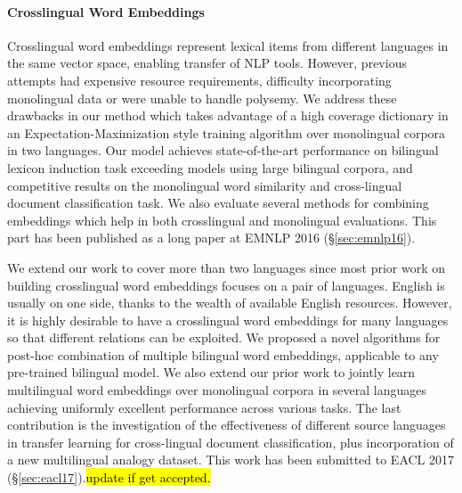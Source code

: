 \documentclass[12pt,twoside,final,hidelinks]{ltthesis}
\theoremstyle{definition}
\newcommand\emnlpvi{EMNLP 2016 (\S\ref{sec:emnlp16})}
\newcommand\eaclvii{EACL 2017 (\S\ref{sec:eacl17})}
\newcommand{\tofix}[1]{\hl{#1}}
\begin{document}
\paragraph{Crosslingual Word Embeddings}
Crosslingual word embeddings represent lexical items from different languages in the same vector space, enabling transfer of NLP tools. 
However, previous attempts had %
expensive resource requirements, difficulty incorporating monolingual data or were unable to handle polysemy.
We address these drawbacks in our method which takes advantage of a high coverage dictionary in an Expectation-Maximization style training algorithm over monolingual corpora in two languages. Our model achieves state-of-the-art performance on bilingual lexicon induction task exceeding models using large bilingual corpora, and
competitive results on the monolingual word similarity and cross-lingual document classification task. We also evaluate several methods for combining embeddings which help in both crosslingual and monolingual evaluations. This part has been published as a long paper at \emnlpvi. 

We extend our work to cover more than two languages since most prior work on building crosslingual word embeddings focuses on a pair of languages.
English is usually on one side, thanks to the wealth of available English resources.
However, it is highly desirable to have a crosslingual word embeddings for many languages so that different relations can be exploited. We proposed a novel algorithms for post-hoc combination of multiple bilingual word embeddings, applicable to any pre-trained bilingual model. We also extend our prior work to jointly learn multilingual word embeddings over monolingual corpora in several languages achieving uniformly excellent performance across various tasks. The last contribution is the investigation of the effectiveness of different source languages in transfer learning for cross-lingual document classification, plus incorporation of a new multilingual analogy dataset. This work has been submitted to \eaclvii.\tofix{update if get accepted.}
\end{document}
